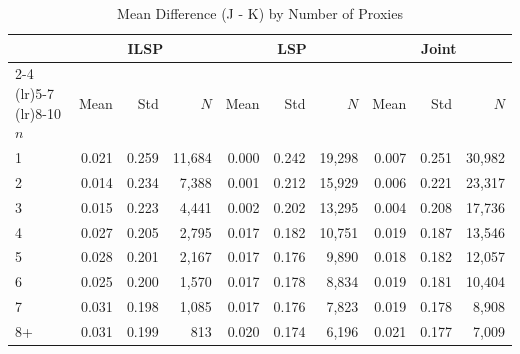 \begin{table}[htbp]
\centering
\caption{Mean Difference (J - K) by Number of Proxies}
\label{tab:mean_diff_by_nproxies}
\begin{tabular}{l rrr rrr rrr}
\toprule
& \multicolumn{3}{c}{ILSP} & \multicolumn{3}{c}{LSP} & \multicolumn{3}{c}{Joint} \\
\cmidrule(lr){2-4} \cmidrule(lr){5-7} \cmidrule(lr){8-10}
$n$ & Mean & Std & $N$ & Mean & Std & $N$ & Mean & Std & $N$ \\
\midrule
1 & 0.021 & 0.259 & 11,684 & 0.000 & 0.242 & 19,298 & 0.007 & 0.251 & 30,982 \\
2 & 0.014 & 0.234 & 7,388 & 0.001 & 0.212 & 15,929 & 0.006 & 0.221 & 23,317 \\
3 & 0.015 & 0.223 & 4,441 & 0.002 & 0.202 & 13,295 & 0.004 & 0.208 & 17,736 \\
4 & 0.027 & 0.205 & 2,795 & 0.017 & 0.182 & 10,751 & 0.019 & 0.187 & 13,546 \\
5 & 0.028 & 0.201 & 2,167 & 0.017 & 0.176 & 9,890 & 0.018 & 0.182 & 12,057 \\
6 & 0.025 & 0.200 & 1,570 & 0.017 & 0.178 & 8,834 & 0.019 & 0.181 & 10,404 \\
7 & 0.031 & 0.198 & 1,085 & 0.017 & 0.176 & 7,823 & 0.019 & 0.178 & 8,908 \\
8+ & 0.031 & 0.199 & 813 & 0.020 & 0.174 & 6,196 & 0.021 & 0.177 & 7,009 \\
\bottomrule
\end{tabular}
\end{table}